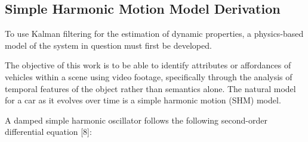 \documentclass[letterpaper, 10 pt, conference]{ieeeconf}  %
\begin{document}
\subsection{Simple Harmonic Motion Model Derivation}
To use Kalman filtering for the estimation of dynamic properties, a physics-based model of the system in question must first be developed.

The objective of this work is to be able to identify attributes or affordances of vehicles within a scene using video footage, specifically through the analysis of temporal features of the object rather than semantics alone. The natural model for a car as it evolves over time is a simple harmonic motion (SHM) model.

A damped simple harmonic oscillator follows the following second-order differential equation [8]:
\end{document}
